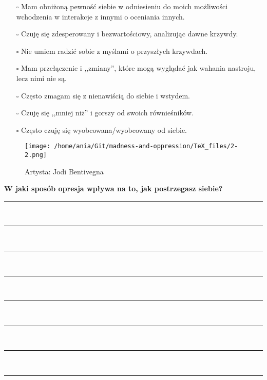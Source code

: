 \begin{multicols}{2}
\begin{itemize}
\item[$\square$]{Mam obniżoną pewność siebie w odniesieniu do moich możliwości wchodzenia w interakcje z innymi o oceniania innych.}
\item[$\square$]{Czuję się zdesperowany i bezwartościowy, analizując dawne krzywdy.}
\item[$\square$]{Nie umiem radzić sobie z myślami o przyszłych krzywdach.}
\item[$\square$]{Mam przełączenie i ,,zmiany'', które mogą wyglądać jak wahania nastroju, lecz nimi nie są.}
\item[$\square$]{Często zmagam się z nienawiścią do siebie i wstydem.}
\item[$\square$]{Czuję się ,,mniej niż'' i gorszy od swoich równieśników.}
\item[$\square$]{Często czuję się wyobcowana/wyobcowany od siebie.}
\end{itemize}
\end{multicols}

\begin{figure}[h]
\centering
\texttt{[image: /home/ania/Git/madness-and-oppression/TeX\_files/2-2.png]}
\caption{Artysta: Jodi Bentivegna}
\label{2-2}
\end{figure}

\newpage
\noindent
\textcolor{ProcessBlue}{\textbf{\Large{W jaki sposób opresja wpływa na to, jak postrzegasz siebie?}}}\\
\noindent\rule{\textwidth}{1pt}\\
\noindent\rule{\textwidth}{1pt}\\
\noindent\rule{\textwidth}{1pt}\\
\noindent\rule{\textwidth}{1pt}\\
\noindent\rule{\textwidth}{1pt}\\
\noindent\rule{\textwidth}{1pt}\\
\noindent\rule{\textwidth}{1pt}\\
\noindent\rule{\textwidth}{1pt}\\\\

